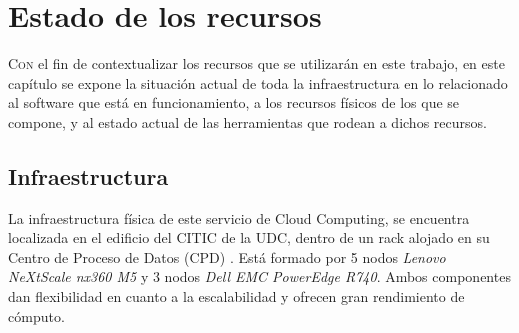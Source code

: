 \chapter{Estado de los recursos}
\label{chap:estadoInfraestructuraSistema}
\lettrine{C}{on} el fin de contextualizar los recursos que se utilizarán en este trabajo, en este capítulo se expone la situación actual de toda la infraestructura en lo relacionado al software que está en funcionamiento, a los recursos físicos de los que se compone, y al estado actual de las herramientas que rodean a dichos recursos.

\section{Infraestructura}
La infraestructura física de este servicio de Cloud Computing, se encuentra localizada en el edificio del CITIC de la UDC, dentro de un rack alojado en su Centro de Proceso de Datos (CPD) \cite{citicUDC}. Está formado por 5 nodos \textit{Lenovo NeXtScale nx360 M5} y 3 nodos \textit{Dell EMC PowerEdge R740}. Ambos componentes dan flexibilidad en cuanto a la escalabilidad y ofrecen gran rendimiento de cómputo.\\

